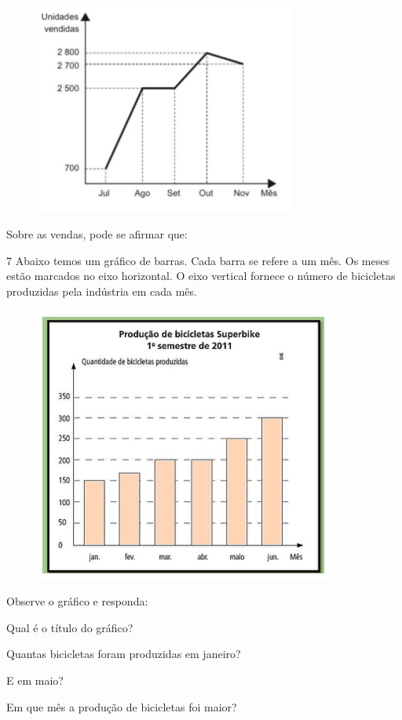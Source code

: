 {\begin{figure}
\includegraphics[width=3.36458in,height=2.73558in]{./imgSAEB_6_MAT/media/image84.png}
\end{figure}

Sobre as vendas, pode se afirmar que:


\num{7}  Abaixo temos um gráfico de barras. Cada barra se refere a um mês. Os
meses estão marcados no eixo horizontal. O eixo vertical fornece o
número de bicicletas produzidas pela indústria em cada mês.

\begin{figure}
\includegraphics[width=3.875in,height=3.57292in]{./imgSAEB_6_MAT/media/image85.png}
\end{figure}

Observe o gráfico e responda:

\begin{escolha}
\item Qual é o título do gráfico? 
\item Quantas bicicletas foram produzidas em janeiro? 
\item E em maio? 
\item Em que mês a produção de bicicletas foi maior? 
\end{escolha}

}
